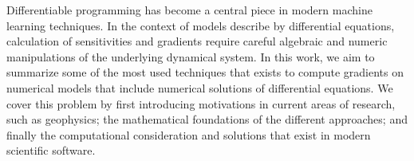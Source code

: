 Differentiable programming has become a central piece in modern machine learning techniques. 
In the context of models describe by differential equations, calculation of sensitivities and gradients require careful algebraic and numeric manipulations of the underlying dynamical system.
In this work, we aim to summarize some of the most used techniques that exists to compute gradients on numerical models that include numerical solutions of differential equations. 
We cover this problem by first introducing motivations in current areas of research, such as geophysics; the mathematical foundations of the different approaches; and finally the computational consideration and solutions that exist in modern scientific software. 
